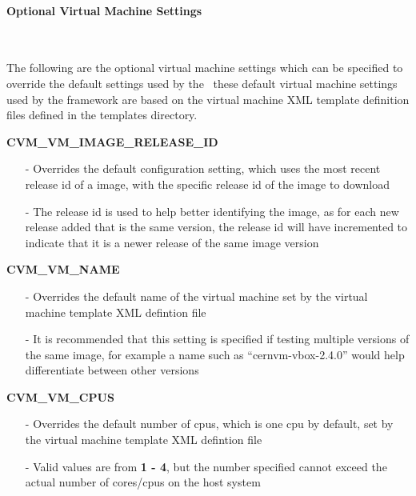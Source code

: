 \paragraph*{Optional Virtual Machine Settings}~\newline

The following are the optional virtual machine settings which can be specified to override
the default settings used by the \cernvmtestframework\, these default virtual machine settings
used by the framework are based on the virtual machine XML template definition files defined
in the templates directory.
 
\begin{description}
\item {\bf CVM\_VM\_IMAGE\_RELEASE\_ID}
		\begin{itemize}
		\item[-]	Overrides the default configuration setting, which uses the most recent
				release id of a \cernvm image, with the specific release id of the 
				\cernvm image to download
		\item[-]	The release id is used to help better identifying the image, as for each new
				release added that is the same version, the release id will have incremented
				to indicate that it is a newer release of the same image version
		\end{itemize}
		
\item {\bf CVM\_VM\_NAME}
		\begin{itemize}
		\item[-]	Overrides the default name of the virtual machine set by the 
				virtual machine template XML defintion file
		\item[-]	It is recommended that this setting is specified if testing multiple
				versions of the same \cernvm image, for example a name such as
				``cernvm-vbox-2.4.0'' would help differentiate between other versions
		\end{itemize}
		
\item {\bf CVM\_VM\_CPUS}
		\begin{itemize}
		\item[-]	Overrides the default number of cpus, which is one cpu by default,
				set by the virtual machine template XML defintion file
		\item[-]	Valid values are from {\bf 1 - 4}, but the number specified cannot
				exceed the actual number of cores/cpus on the host system
		\end{itemize}
	

\end{description}
